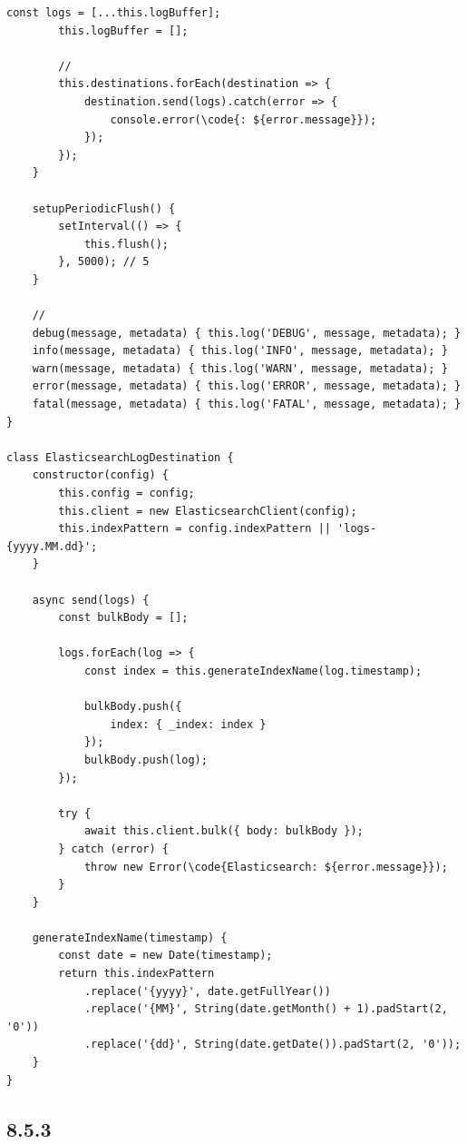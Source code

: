 \begin{lstlisting}[style=javascript]
        const logs = [...this.logBuffer];
        this.logBuffer = [];
        
        // 
        this.destinations.forEach(destination => {
            destination.send(logs).catch(error => {
                console.error(\code{: ${error.message}});
            });
        });
    }
    
    setupPeriodicFlush() {
        setInterval(() => {
            this.flush();
        }, 5000); // 5
    }
    
    // 
    debug(message, metadata) { this.log('DEBUG', message, metadata); }
    info(message, metadata) { this.log('INFO', message, metadata); }
    warn(message, metadata) { this.log('WARN', message, metadata); }
    error(message, metadata) { this.log('ERROR', message, metadata); }
    fatal(message, metadata) { this.log('FATAL', message, metadata); }
}

class ElasticsearchLogDestination {
    constructor(config) {
        this.config = config;
        this.client = new ElasticsearchClient(config);
        this.indexPattern = config.indexPattern || 'logs-{yyyy.MM.dd}';
    }
    
    async send(logs) {
        const bulkBody = [];
        
        logs.forEach(log => {
            const index = this.generateIndexName(log.timestamp);
            
            bulkBody.push({
                index: { _index: index }
            });
            bulkBody.push(log);
        });
        
        try {
            await this.client.bulk({ body: bulkBody });
        } catch (error) {
            throw new Error(\code{Elasticsearch: ${error.message}});
        }
    }
    
    generateIndexName(timestamp) {
        const date = new Date(timestamp);
        return this.indexPattern
            .replace('{yyyy}', date.getFullYear())
            .replace('{MM}', String(date.getMonth() + 1).padStart(2, '0'))
            .replace('{dd}', String(date.getDate()).padStart(2, '0'));
    }
}
\end{lstlisting}

\hypertarget{section-125}{%
\subsection{8.5.3}\label{section-125}}

\hypertarget{section-126}{%
\subsubsection{}\label{section-126}}

